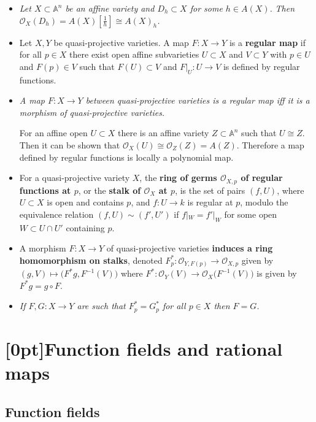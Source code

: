\documentclass[10pt]{article}
\newcommand{\aff}{\mathbb{A}}
\newcommand{\AG}{\textcolor{green}{AG}}
\begin{document}
\begin{itemize}
                \item \emph{Let $X\subset\aff^n$ be an affine variety and $D_h\subset X$ for some $h\in A(X)$.}
                    \emph{Then $\mathcal{O}_X(D_h)=A(X)[\frac{1}{h}]\cong A(X)_h$.}

                \item Let $X,Y$ be quasi-projective varieties.
                    A map $F\colon X\to Y$ is a \textbf{regular map} if for all $p\in X$ there exist open affine subvarieties $U\subset X$ and $V\subset Y$ with $p\in U$ and $F(p)\in V$ such that $F(U)\subset V$ and $F|_U\colon U\to V$ is defined by regular functions.
                \item \emph{A map $F\colon X\to Y$ between quasi-projective varieties is a regular map iff it is a morphism of quasi-projective varieties.}

                    For an affine open $U\subset X$ there is an affine variety $Z\subset\aff^n$ such that $U\cong Z$.
                    Then it can be shown that $\mathcal{O}_X(U)\cong\mathcal{O}_Z(Z)=A(Z)$.
                    Therefore a map defined by regular functions is locally a polynomial map.

                \item For a quasi-projective variety $X$, the \textbf{ring of germs $\mathcal{O}_{X,p}$ of regular functions at $p$}, or the \textbf{stalk of $\mathcal{O}_X$ at $p$}, is the set of pairs $(f,U)$, where $U\subset X$ is open and contains $p$, and $f\colon U\to k$ is regular at $p$, modulo the equivalence relation $(f,U)\sim(f',U')$ if $f|_W=f'|_W$ for some open $W\subset U\cap U'$ containing $p$.
                \item A morphism $F\colon X\to Y$ of quasi-projective varieties \textbf{induces a ring homomorphism on stalks}, denoted $F_p^*\colon\mathcal{O}_{Y,F(p)}\to\mathcal{O}_{X,p}$ given by $(g,V)\mapsto\big(F^*g,F^{-1}(V)\big)$ where $F^*\colon\mathcal{O}_Y(V)\to\mathcal{O}_X\big(F^{-1}(V)\big)$ is given by $F^*g=g\circ F$.
                \item \emph{If $F,G\colon X\to Y$ are such that $F_p^*=G_p^*$ for all $p\in X$ then $F=G$.}
            \end{itemize}

    \section{\protect\marginnote{\AG}[0pt]Function fields and rational maps}

        \subsection{Function fields}
\end{document}

